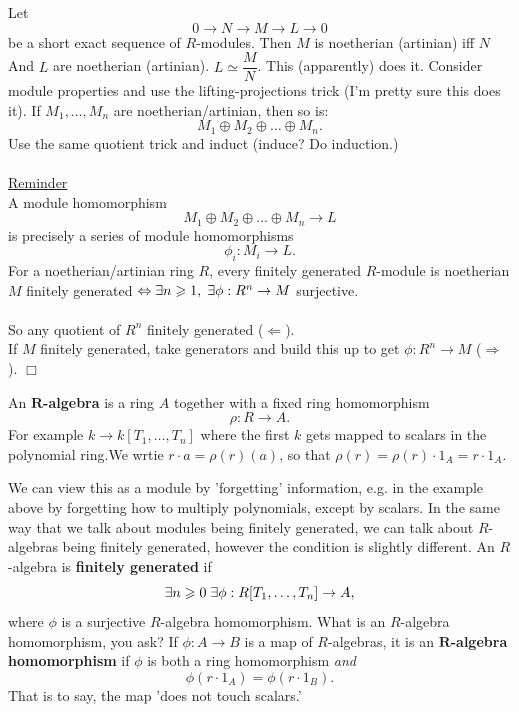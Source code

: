\documentclass{article}
\begin{document}
\lem Let \[
0\rightarrow N \rightarrow M \rightarrow L \rightarrow 0\]
be a short exact sequence of $R$-modules. Then $M$ is noetherian (artinian) iff $N$ And $L$ are noetherian (artinian).
\proof $L \simeq \dfrac{M}{N}$. This (apparently) does it. Consider module properties and use the lifting-projections trick (I'm pretty sure this does it).
\cor If $M_{1}, \dots, M_{n}$ are noetherian/artinian, then so is: \[
M_{1} \oplus M_{2} \oplus \dots \oplus M_{n}. \] \proof Use the same quotient trick and induct (induce? Do induction.)\\ \hspace{0.1cm} \\
\large
\underline{Reminder} \hspace{0.1cm} \\
\normalsize A module homomorphism \[ M_{1} \oplus M_{2} \oplus \dots \oplus M_{n} \to L \] is precisely a series of module homomorphisms \[ \phi_{i} : M_{i} \to L.\]
\prop For a noetherian/artinian ring $R$, every finitely generated $R$-module is noetherian
\proof $M$ finitely generated $\Leftrightarrow \exists n \geq 1, \hspace{0.1cm} \exists \phi : R^{n} \to M$ surjective. \\ \hspace{0.1cm} \\So any quotient of $R^n$ finitely generated ($\Leftarrow$).\\
If $M$ finitely generated, take generators and build this up to get $\phi : R^{n} \to M$ ($\Rightarrow$). $\Box$
\begin{fancydefine}[$R$-algebra]
    An $\mathbf{R}$\textbf{-algebra} is a ring $A$ together with a fixed ring homomorphism \[ \rho : R \to A.\] For example $k \to k[T_{1},\dots, T_{n}]$ where the first $k$ gets mapped to scalars in the polynomial ring.\gap We wrtie $r \cdot a = \rho(r)(a)$, so that $\rho(r) = \rho(r) \cdot 1_{A} = r \cdot 1_{A}$.
\end{fancydefine}
We can view this as a module by 'forgetting' information, e.g. in the example above by forgetting how to multiply polynomials, except by scalars. \gap
In the same way that we talk about modules being finitely generated, we can talk about $R$-algebras being finitely generated, however the condition is slightly different.
 An $R$-algebra is \textbf{finitely generated} if \[ \exists n \geq 0 \hspace{0.1cm} \exists \phi : R[T_{1},\dots, T_{n}] \to A, \]
where $\phi$ is a surjective $R$-algebra homomorphism. What is an $R$-algebra homomorphism, you ask? 
 If $\phi : A \to B$ is a map of $R$-algebras, it is an $\mathbf{R}$\textbf{-algebra homomorphism} if $\phi$ is both a ring homomorphism \textit{and} \[ \phi(r \cdot 1_{A}) = \phi(r \cdot 1_{B}). \] That is to say, the map 'does not touch scalars.'
\end{document}
